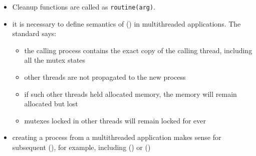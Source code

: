 \label{PTHREAD_CLEANUP}

\begin{itemize}
\item Cleanup functions are called as \texttt{routine(arg)}.
\end{itemize}


\begin{slide}
\prgchars
\begin{itemize}
\item it is necessary to define semantics of () in multithreaded
applications.  The standard says:

\begin{itemize}
\item the calling process contains the exact copy of the calling thread,
including all the mutex states
\item other threads are not propagated to the new process
\item if such other threads held allocated memory, the memory will remain
allocated but lost
\item mutexes locked in other threads will remain locked for ever
\end{itemize}
\item creating a process from a multithreaded application makes sense for
subsequent (), for example,  including () or
()
\end{itemize}
\end{slide}


